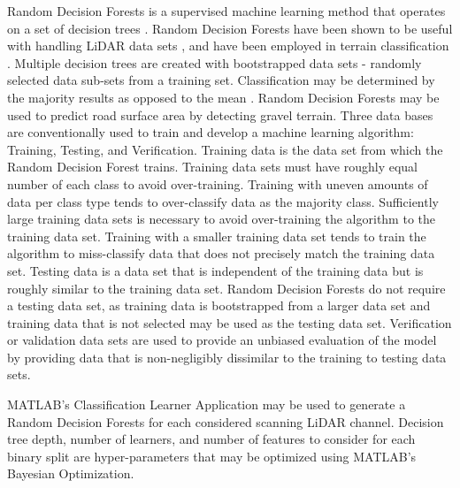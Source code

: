\documentclass[numbered,pdftex]{ohio-etd}
\begin{document}
{{		{Random Decision Forests is a supervised machine learning method that operates on a set of decision trees \cite{ho_random_1995}. Random Decision Forests have been shown to be useful with handling LiDAR data sets \cite{breiman_random_2001}, and have been employed in terrain classification \cite{laible_3d_2012,laible_map_building,laible_terrain_2013,khan_high_2011,reymann_improving_2015,schilling_geometric_2017, wietrzykowski_context-aware_2019}. Multiple decision trees are created with bootstrapped data sets - randomly selected data sub-sets from a training set. Classification may be determined by the majority results as opposed to the mean \cite{breiman_random_2001,ho_random_1995}. Random Decision Forests may be used to predict road surface area by detecting gravel terrain. Three data bases are conventionally used to train and develop a machine learning algorithm: Training, Testing, and Verification. Training data is the data set from which the Random Decision Forest trains. Training data sets must have roughly equal number of each class to avoid over-training. Training with uneven amounts of data per class type tends to over-classify data as the majority class. Sufficiently large training data sets is necessary to avoid over-training the algorithm to the training data set. Training with a smaller training data set tends to train the algorithm to miss-classify data that does not precisely match the training data set. Testing data is a data set that is independent of the training data but is roughly similar to the training data set. Random Decision Forests do not require a testing data set, as training data is bootstrapped from a larger data set and training data that is not selected may be used as the testing data set. Verification or validation data sets are used to provide an unbiased evaluation of the model by providing data that is non-negligibly dissimilar to the training to testing data sets. } 
		
		{MATLAB's Classification Learner Application may be used to generate a Random Decision Forests for each considered scanning LiDAR channel. Decision tree depth, number of learners, and number of features to consider for each binary split are hyper-parameters that may be optimized using MATLAB's Bayesian Optimization.}
		
}}
\end{document}
